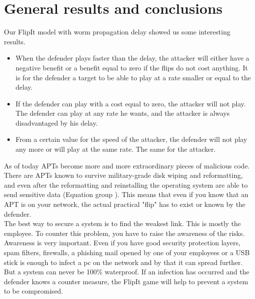 \section{General results and conclusions}
Our FlipIt model with worm propagation delay showed us some interesting results. 
\begin{itemize}
\item When the defender plays faster than the delay, the attacker will either have a negative benefit or a benefit equal to zero if the flips do not cost anything. It is for the defender a target to be able to play at a rate smaller or equal to the delay.
\item If the defender can play with a cost equal to zero, the attacker will not play. The defender can play at any rate he wants, and the attacker is always disadvantaged by his delay.
\item From a certain value for the speed of the attacker, the defender will not play any more or will play at the same rate. The same for the attacker.
\end{itemize}

As of today APTs become more and more extraordinary pieces of malicious code. There are APTs known to survive military-grade disk wiping and reformatting, and even after the reformatting and reinstalling the operating system are able to send sensitive data (Equation group \citep{Equation}). This means that even if you know that an APT is on your network, the actual practical "flip" has to exist or known by the defender.  \\
The best way to secure a system is to find the weakest link. This is mostly the employee. To counter this problem, you have to raise the awareness of the risks.  Awareness is very important. Even if you have good security protection layers, spam filters, firewalls, a phishing mail opened by one of your employees or a USB stick is enough to infect a pc on the network and by that it can spread further. But a system can never be 100\% waterproof. If an infection has occurred and the defender knows a counter measure, the FlipIt game will help to prevent a system to be compromised. 
